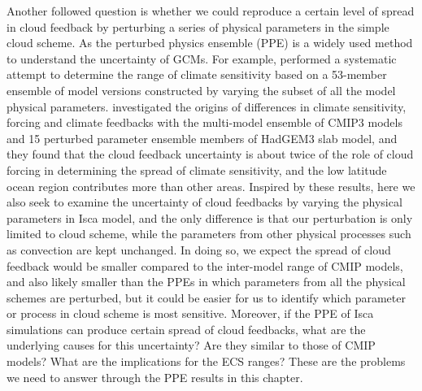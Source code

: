 Another followed question is whether we could reproduce a certain level of spread in cloud feedback by perturbing a series of physical parameters in the simple cloud scheme. As the perturbed physics ensemble (PPE) is a widely used method to understand the uncertainty of GCMs. For example, \cite{Murphy2004quantification} performed a systematic attempt to determine the range of climate sensitivity based on a 53-member ensemble of model versions constructed by varying the subset of all the model physical parameters. \cite{Webb2013origins} investigated the origins of differences in climate sensitivity, forcing and climate feedbacks with the multi-model ensemble of CMIP3 models and 15 perturbed parameter ensemble members of HadGEM3 slab model, and they found that the cloud feedback uncertainty is about twice of the role of cloud forcing in determining the spread of climate sensitivity, and the low latitude ocean region contributes more than other areas. Inspired by these results, here we also seek to examine the uncertainty of cloud feedbacks by varying the physical parameters in Isca model, and the only difference is that our perturbation is only limited to cloud scheme, while the parameters from other physical processes such as convection are kept unchanged. In doing so, we expect the spread of cloud feedback would be smaller compared to the inter-model range of CMIP models, and also likely smaller than the PPEs in which parameters from all the physical schemes are perturbed, but it could be easier for us to identify which parameter or process in cloud scheme is most sensitive. Moreover, if the PPE of Isca simulations can produce certain spread of cloud feedbacks, what are the underlying causes for this uncertainty? Are they similar to those of CMIP models? What are the implications for the ECS ranges? These are the problems we need to answer through the PPE results in this chapter.


